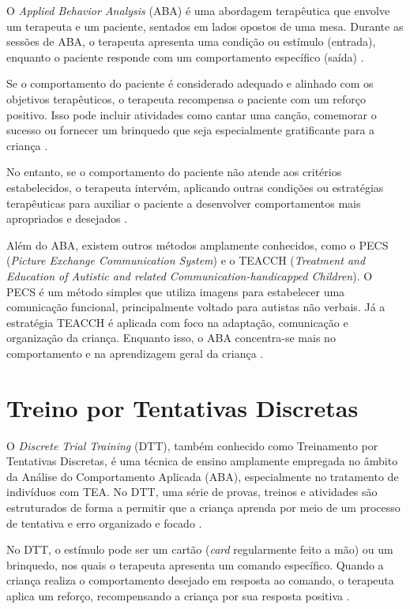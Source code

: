 O \textit{Applied Behavior Analysis} (ABA) é uma abordagem terapêutica que envolve um terapeuta e um paciente, 
sentados em lados opostos de uma mesa. Durante as sessões de ABA, 
o terapeuta apresenta uma condição ou estímulo (entrada), 
enquanto o paciente responde com um comportamento específico (saída) \cite{artoni2011accessible}.

Se o comportamento do paciente é considerado adequado e alinhado com os objetivos terapêuticos, 
o terapeuta recompensa o paciente com um reforço positivo. 
Isso pode incluir atividades como cantar uma canção, 
comemorar o sucesso ou fornecer um brinquedo que seja especialmente gratificante para a criança \cite{artoni2018technology}.

No entanto, se o comportamento do paciente não atende aos critérios estabelecidos, 
o terapeuta intervém, aplicando outras condições ou estratégias terapêuticas para auxiliar o paciente a desenvolver comportamentos mais apropriados e desejados \cite{artoni2011accessible}.

Além do ABA, existem outros métodos amplamente conhecidos, como o PECS 
(\textit{Picture Exchange Communication System}) e o TEACCH 
(\textit{Treatment and Education of Autistic and related Communication-handicapped Children}). 
O PECS é um método simples que utiliza imagens para estabelecer uma comunicação funcional, 
principalmente voltado para autistas não verbais. 
Já a estratégia TEACCH é aplicada com foco na adaptação, 
comunicação e organização da criança. Enquanto isso, 
o ABA concentra-se mais no comportamento e na aprendizagem geral da criança \cite{viana2020autismo}.

\section{Treino por Tentativas Discretas}

O \textit{Discrete Trial Training} (DTT), 
também conhecido como Treinamento por Tentativas Discretas, 
é uma técnica de ensino amplamente empregada no âmbito da Análise do Comportamento Aplicada (ABA), 
especialmente no tratamento de indivíduos com TEA. 
No DTT, uma série de provas, treinos e atividades são estruturados de forma a permitir que a criança aprenda por meio de um processo de tentativa e erro organizado e focado \cite{artoni2012designing}.

No DTT, o estímulo pode ser um cartão 
(\textit{card} regularmente feito a mão) ou um brinquedo, 
nos quais o terapeuta apresenta um comando específico. 
Quando a criança realiza o comportamento desejado em resposta ao comando, 
o terapeuta aplica um reforço, recompensando a criança por sua resposta positiva \cite{artoni2011accessible}.

